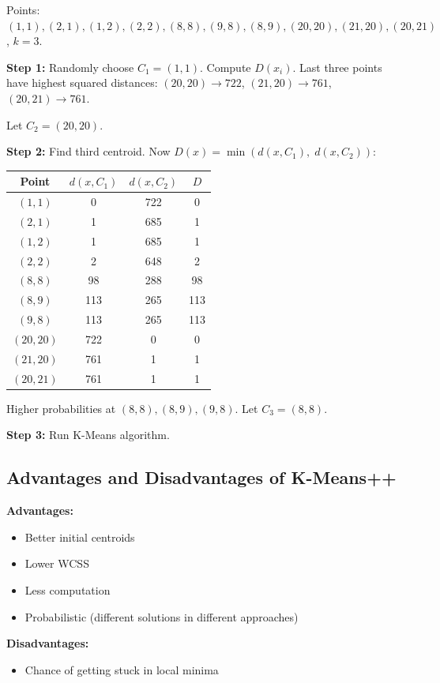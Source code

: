 \documentclass[12pt,a4paper]{article}
\begin{document}
\begin{examplebox}
Points: $(1,1),(2,1),(1,2),(2,2),(8,8),(9,8),(8,9),(20,20),(21,20),(20,21)$, $k=3$.

\textbf{Step 1:} Randomly choose $C_1 = (1,1)$. Compute $D(x_i)$.
Last three points have highest squared distances: $(20,20)\to 722$, $(21,20)\to 761$, $(20,21)\to 761$.

Let $C_2 = (20,20)$.

\textbf{Step 2:} Find third centroid. Now $D(x) = \min(d(x,C_1),\; d(x,C_2))$:
\begin{center}
\begin{tabular}{cccc}
\toprule
Point & $d(x,C_1)$ & $d(x,C_2)$ & $D$ \\
\midrule
$(1,1)$ & 0 & 722 & 0 \\
$(2,1)$ & 1 & 685 & 1 \\
$(1,2)$ & 1 & 685 & 1 \\
$(2,2)$ & 2 & 648 & 2 \\
$(8,8)$ & 98 & 288 & 98 \\
$(8,9)$ & 113 & 265 & 113 \\
$(9,8)$ & 113 & 265 & 113 \\
$(20,20)$ & 722 & 0 & 0 \\
$(21,20)$ & 761 & 1 & 1 \\
$(20,21)$ & 761 & 1 & 1 \\
\bottomrule
\end{tabular}
\end{center}
Higher probabilities at $(8,8),(8,9),(9,8)$. Let $C_3 = (8,8)$.

\textbf{Step 3:} Run K-Means algorithm.
\end{examplebox}

\subsection{Advantages and Disadvantages of K-Means++}

\begin{minipage}[t]{0.48\textwidth}
\textbf{Advantages:}
\begin{itemize}
  \item Better initial centroids
  \item Lower WCSS
  \item Less computation
  \item Probabilistic (different solutions in different approaches)
\end{itemize}
\end{minipage}
\hfill
\begin{minipage}[t]{0.48\textwidth}
\textbf{Disadvantages:}
\begin{itemize}
  \item Chance of getting stuck in local minima
\end{itemize}
\end{minipage}
\end{document}
